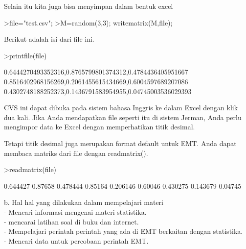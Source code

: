 \documentclass[a4paper,10pt]{article}
\begin{document}
\begin{eulernotebook}
\begin{eulercomment}
\begin{eulercomment}
\begin{eulercomment}
\begin{eulercomment}
\begin{eulercomment}
\begin{eulercomment}
\begin{eulercomment}
\begin{eulercomment}
\begin{eulercomment}
\begin{eulercomment}
\begin{eulercomment}
\begin{eulercomment}
\begin{euleroutput}
\end{euleroutput}
\begin{eulercomment}
Selain itu kita juga bisa menyimpan dalam bentuk excel
\end{eulercomment}
\begin{eulerprompt}
>file="test.csv";
>M=random(3,3); writematrix(M,file);
\end{eulerprompt}
\begin{eulercomment}
Berikut adalah isi dari file ini.
\end{eulercomment}
\begin{eulerprompt}
>printfile(file)
\end{eulerprompt}
\begin{euleroutput}
  0.6444270493352316,0.8765799801374312,0.4784436405951667
  0.8516402968156269,0.2061455615434669,0.6004597689207086
  0.4302748188252373,0.1436791583954955,0.04745003536029393
  
\end{euleroutput}
\begin{eulercomment}
CVS ini dapat dibuka pada sistem bahasa Inggris ke dalam Excel dengan
klik dua kali. Jika Anda mendapatkan file seperti itu di sistem
Jerman, Anda perlu mengimpor data ke Excel dengan memperhatikan titik
desimal.

Tetapi titik desimal juga merupakan format default untuk EMT. Anda
dapat membaca matriks dari file dengan readmatrix().
\end{eulercomment}
\begin{eulerprompt}
>readmatrix(file)
\end{eulerprompt}
\begin{euleroutput}
       0.644427       0.87658      0.478444 
        0.85164      0.206146       0.60046 
       0.430275      0.143679       0.04745 
\end{euleroutput}
\begin{eulercomment}
b. Hal hal yang dilakukan dalam mempelajari materi\\
- Mencari informasi mengenai materi statistika.\\
- mencarai latihan soal di buku dan internet.\\
- Mempelajari perintah perintah yang ada di EMT berkaitan dengan
statistika.\\
- Mencari data untuk percobaan perintah EMT.


\end{eulercomment}
\end{eulercomment}
\end{eulercomment}
\end{eulercomment}
\end{eulercomment}
\end{eulercomment}
\end{eulercomment}
\end{eulercomment}
\end{eulercomment}
\end{eulercomment}
\end{eulercomment}
\end{eulercomment}
\end{eulercomment}
\end{eulernotebook}
\end{document}
